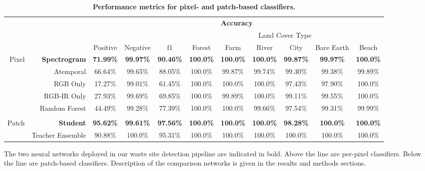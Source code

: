 \documentclass[10pt,letterpaper]{article}
\begin{document}
\begin{table}[!ht]
    \begin{adjustwidth}{-2.25in}{0in}
    \setlength{\tabcolsep}{3pt}
    \caption{\textbf{ Performance metrics for pixel- and patch-based classifiers.}}
    \label{table:classifier_accuracy}
    \centering
    \begin{tabular}{rrccccccccc}
    \toprule
    \multicolumn{1}{l}{} & \multicolumn{1}{l}{} & \multicolumn{9}{c}{\textbf{Accuracy}} \\
    \multicolumn{1}{l}{\rule{0pt}{1ex}} & \multicolumn{1}{l}{} & \multicolumn{3}{l}{} & \multicolumn{6}{c}{Land Cover Type} \\
    \cmidrule{6-11}
    \multicolumn{1}{l}{} & \multicolumn{1}{c}{} & Positive & Negative & f1 & Forest & Farm & River & City & Bare Earth & Beach \\
    \cmidrule{3-11}
    \multirow{5}{*}{Pixel} & \textbf{Spectrogram} & \textbf{71.99\%} & \textbf{99.97\%} & \textbf{90.46\%} & \textbf{100.0\%} & \textbf{100.0\%} & \textbf{100.0\%} & \textbf{99.87\%} & \textbf{99.97\%} & \textbf{100.0\%} \\
     & Atemporal & 66.64\% & 99.65\% & 88.05\% & 100.0\% & 99.87\% & 99.74\% & 99.30\% & 99.38\% & 99.89\% \\
     & RGB Only & 17.27\% & 99.01\% & 61.45\% & 100.0\% & 100.0\% & 100.0\% & 97.43\% & 97.90\% & 100.0\% \\
     & RGB-IR Only & 27.93\% & 99.69\% & 69.85\% & 100.0\% & 99.89\% & 100.0\% & 99.11\% & 99.55\% & 100.0\% \\
     & Random Forest & 44.49\% & 99.28\% & 77.39\% & 100.0\% & 100.0\% & 99.66\% & 97.54\% & 99.31\% & 99.99\% \\
    \multicolumn{1}{l}{} &  &  &  &  &  &  &  &  &  &  \\
    \cmidrule{2-11}
    \multicolumn{1}{c}{\multirow{2}{*}{Patch}} & \textbf{Student} & \textbf{95.62\%} & \textbf{99.61\%} & \textbf{97.56\%} & \textbf{100.0\%} & \textbf{100.0\%} & \textbf{100.0\%} & \textbf{98.28\%} & \textbf{100.0\%} & \textbf{100.0\%} \\
    \multicolumn{1}{c}{} & Teacher Ensemble & 90.88\% & 100.0\% & 95.31\% & 100.0\% & 100.0\% & 100.0\% & 100.0\% & 100.0\% & 100.0\% \\
    \bottomrule
    \end{tabular}
    \begin{flushleft}The two neural networks deployed in our waste site detection pipeline are indicated in bold. Above the line are per-pixel classifiers. Below the line are patch-based classifiers. Description of the comparison networks is given in the results and methods sections.
    \end{flushleft}
    \end{adjustwidth}
\end{table}
\end{document}
